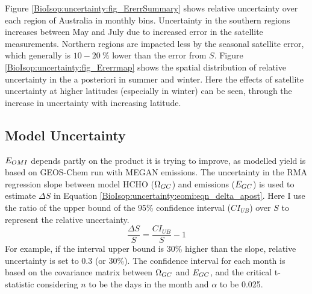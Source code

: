     
    Figure \ref{BioIsop:uncertainty:fig_ErerrSummary} shows relative uncertainty over each region of Australia in monthly bins.
    Uncertainty in the southern regions increases between May and July due to increased error in the satellite measurements.
    Northern regions are impacted less by the seasonal satellite error, which generally is $10-20~\%$ lower than the error from $S$.
    Figure \ref{BioIsop:uncertainty:fig_Ererrmap} shows the spatial distribution of relative uncertainty in the a posteriori in summer and winter.
    Here the effects of satellite uncertainty at higher latitudes (especially in winter) can be seen, through the increase in uncertainty with increasing latitude.
    
    
    
    
  \subsection{Model Uncertainty}
    \label{BioIsop:uncertainty:Model}
    
    $E_{OMI}$ depends partly on the product it is trying to improve, as modelled yield is based on GEOS-Chem run with MEGAN emissions.
    The uncertainty in the RMA regression slope between model HCHO ($\Omega_{GC}$) and emissions ($E_{GC}$) is used to estimate $\Delta S$ in Equation \ref{BioIsop:uncertainty:eomi:eqn_delta_apost}.
    Here I use the ratio of the upper bound of the 95\% confidence interval ($CI_{UB}$) over $S$ to represent the relative uncertainty.
    \begin{equation}
      \frac{\Delta S}{S} = \frac{CI_{UB}}{S} - 1
    \end{equation}
    For example, if the interval upper bound is 30\% higher than the slope, relative uncertainty is set to 0.3 (or 30\%).
    The confidence interval for each month is based on the covariance matrix between $\Omega_{GC}$ and $E_{GC}$, and the critical t-statistic considering $n$ to be the days in the month and $\alpha$ to be 0.025.
    
